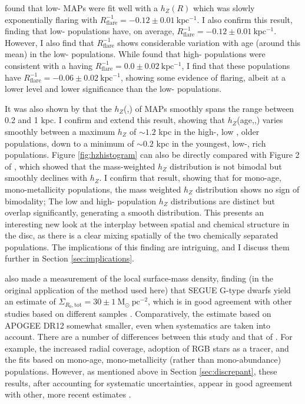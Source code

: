 \citet{2016ApJ...823...30B} found that low-\afe{} MAPs were fit well with a $h_Z(R)$ which was slowly exponentially flaring with $R_{\mathrm{flare}}^{-1} = -0.12 \pm 0.01 \ \mathrm{kpc^{-1}}$. I also confirm this result, finding that low-\afe{} populations have, on average, $R_{\mathrm{flare}}^{-1} = -0.12 \pm 0.01 \ \mathrm{kpc^{-1}}$. However, I also find that $R_{\mathrm{flare}}^{-1}$ shows considerable variation with age (around this mean) in the low-\afe{} populations. While \citet{2016ApJ...823...30B} found that high-\afe{} populations were consistent with a having $R_{\mathrm{flare}}^{-1} = 0.0 \pm 0.02\ \mathrm{kpc^{-1}}$, I find that these populations have $R_{\mathrm{flare}}^{-1} = -0.06 \pm 0.02\ \mathrm{kpc^{-1}}$, showing some evidence of flaring, albeit at a lower level and lower significance than the low-\afe{} populations.

 It was also shown by \citet{2012ApJ...753..148B,2016ApJ...823...30B} that the $h_Z$(\afe{},\feh{}) of MAPs smoothly spans the range between 0.2 and 1 kpc. I confirm and extend this result, showing that $h_Z$(age,\afe{},\feh{}) varies smoothly between a maximum $h_Z$ of $\sim 1.2$ kpc in the high-\afe{}, low \feh{}, older populations, down to a minimum of $\sim 0.2$ kpc in the youngest, low-\afe{}, \feh{} rich populations. Figure \ref{fig:hzhistogram} can also be directly compared with Figure 2 of \citet{2012ApJ...751..131B}, which showed that the mass-weighted $h_Z$ distribution is not bimodal but smoothly declines with $h_Z$. I confirm that result, showing that for mono-age, mono-metallicity populations, the mass weighted $h_Z$ distribution shows no sign of bimodality; The low and high-\afe{} population $h_Z$ distributions are distinct but overlap significantly, generating a smooth distribution. This presents an interesting new look at the interplay between spatial and chemical structure in the disc, as there is a clear mixing spatially of the two chemically separated populations. The implications of this finding are intriguing, and I discuss them further in Section \ref{sec:implications}.

\citet{2012ApJ...751..131B} also made a measurement of the local surface-mass density, finding (in the original application of the method used here) that SEGUE G-type dwarfs yield an estimate of $\Sigma_{R_0,\text{tot}} = 30 \pm 1\ \mathrm{M_{\odot}\ pc^{-2}}$, which is in good agreement with other studies based on different samples \citep[e.g.][]{2006MNRAS.372.1149F,2015ApJ...814...13M}.  Comparatively, the estimate based on APOGEE DR12 somewhat smaller, even when systematics are taken into account. There are a number of differences between this study and that of \citet{2012ApJ...751..131B}. For example, the increased radial coverage, adoption of RGB stars as a tracer, and the fits based on mono-age, mono-metallicity (rather than mono-abundance) populations. However, as mentioned above in Section \ref{sec:discrepant}, these results, after accounting for systematic uncertainties, appear in good agreement with other, more recent estimates \citep{2015ApJ...814...13M}. 

